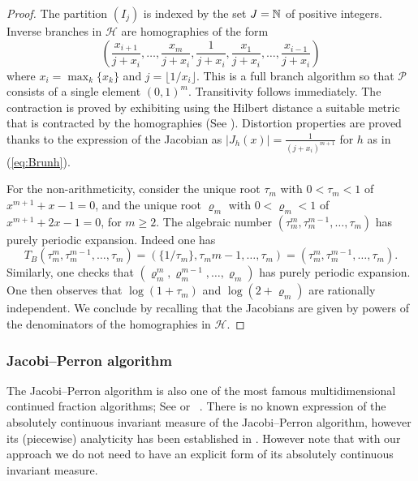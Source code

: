 \documentclass[12pt,a4paper,reqno]{amsart}
\begin{document}
\begin{proof} The  partition $(I_j)$  is  indexed  by the  set  $J={\mathbb N}$ of positive integers.
Inverse  branches in ${\mathcal H}$  are homographies  of the  form 
\begin{equation}\label{eq:Brunh}
 \left( \frac {x_{i+1}} {j+ x_i},
 \ldots,   \frac {x_{m}} {j + x_i},  \frac 1 {j + x_i}, \frac {x_{1}} {j + x_i}, \ldots,   \frac {x_{i-1}} {j + x_i}\right)
 \end{equation}
 where $x_i = \max_{k} \{x_k\}$ and $j =\lfloor 1/x_i\rfloor$. This is a full branch algorithm so that $\mathcal{P}$ consists of a single element $(0,1)^m$. Transitivity follows immediately. The contraction  is  proved by  exhibiting using
  the Hilbert distance a suitable  metric that is  contracted by the homographies
(See \cite[Annexe]{BAG:01}).   Distortion properties are proved thanks to the  expression of the  Jacobian as 
$|J_h(x)|= \frac{1}{(j+x_i)^{m+1}}$  for $h$ as in  (\ref{eq:Brunh}).



For the  non-arithmeticity, consider  the  unique root  $\tau_m$   with  $0< \tau_m <1$  of $x^{m+1}+x-1=0$, and  the unique root $\varrho_m$ 
with  $0< \varrho_m <1$  of $x^{m+1}+2x-1=0$,
for $ m \geq 2$. The algebraic number $(\tau_m^m ,  \tau_m^{m-1}, \ldots, \tau_m)$ has  purely periodic expansion. Indeed one has 
 $$T_B (\tau_m^m ,  \tau_m^{m-1}, \ldots, \tau_m)= (\{1/\tau_m\},\tau_m{m-1},   \ldots, \tau_m)= (\tau_m ^m ,  \tau_m^{m-1}, \ldots, \tau_m).$$
  Similarly,  one checks  that  $(\varrho_m^m ,  \varrho_m^{m-1}, \ldots, \varrho_m)$
  has   purely periodic expansion. One then  observes  that 
  $\log(  1 + \tau_m)$ and   $\log(  2 + \varrho_m)$ are rationally independent. We conclude by  recalling that the  Jacobians  are  given  by  powers of the denominators of the homographies in $\mathcal{H}$. 
\end{proof}



\subsubsection{Jacobi--Perron algorithm}  \label{subsec:JP}
The  Jacobi--Perron algorithm   is  also one of the most famous multidimensional continued fraction algorithms;  See \cite{Bernstein:71,Heine1868,Perron:07,Schweiger:73} or ~\cite[Chapter~4]{Schweiger:00}.  %
There is no known     expression of    the  absolutely continuous invariant measure  of the  Jacobi--Perron algorithm, however its (piecewise) analyticity has been established in \cite{broise}. However note that with our  approach  we do not need to have  an explicit  form  of  its absolutely continuous invariant measure.
\end{document}
